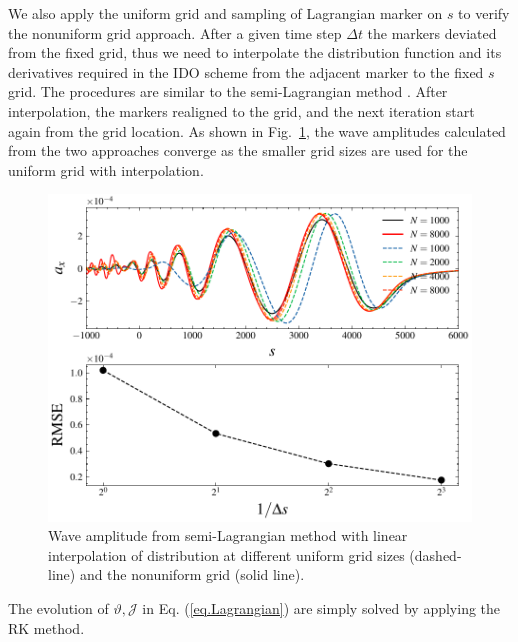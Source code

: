 We also apply the uniform grid and sampling of Lagrangian marker on $s$ to verify the nonuniform grid approach. 
After a given time step $\Delta t$ the markers deviated from the fixed grid, thus  we need to interpolate the distribution function and its derivatives required in the IDO scheme from the adjacent marker to the fixed $s$ grid.
The procedures are similar to the semi-Lagrangian method \cite{sonnendrucker1999,cottet2018}.
After interpolation, the markers realigned to the grid, and the next iteration start again from the grid location.
As shown in Fig.~\ref{fig.cmp1}, the wave amplitudes calculated from  the two approaches converge  as the smaller grid sizes are used for  the   uniform grid with interpolation.  
\begin{figure}[htbp]
    \centering
    \includegraphics[scale=0.5]{cpc_img/fig_semiL.pdf}
    \caption{Wave amplitude from semi-Lagrangian method with linear interpolation of distribution at different uniform grid sizes (dashed-line) and the nonuniform grid (solid line).
    }
    \label{fig.cmp1}
\end{figure}
The evolution of $\vartheta,\mathcal{J}$ in Eq. (\ref{eq.Lagrangian}) are simply solved by applying the RK method.

